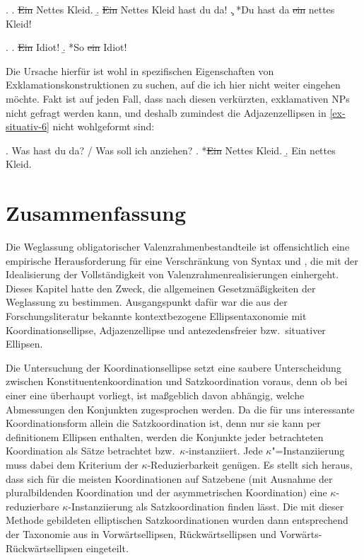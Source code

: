 \ex. \label{ex-situativ-4}
\a. \sout{Ein} Nettes Kleid.
\b. \sout{Ein} Nettes Kleid hast du da!
\c. *Du hast da \sout{ein} nettes Kleid!

\ex. \label{ex-situativ-5}
\a. \sout{Ein} Idiot!
\b. *So \sout{ein} Idiot!

Die Ursache hierfür ist wohl in spezifischen Eigenschaften von Exklamationskonstruktionen zu suchen, auf die ich hier nicht weiter eingehen möchte. Fakt ist auf jeden Fall, dass nach diesen verkürzten, exklamativen NPs nicht gefragt werden kann, und deshalb zumindest die Adjazenzellipsen in \ref{ex-situativ-6} nicht wohlgeformt sind:    

\ex. \label{ex-situativ-6}Was hast du da? / Was soll ich anziehen?
\a. *\sout{Ein} Nettes Kleid.
\b. Ein nettes Kleid.



\section{Zusammenfassung}

Die Weglassung obligatorischer Valenzrahmenbestandteile ist offensichtlich eine empirische Herausforderung für eine Verschränkung von Syntax und , die mit der Idealisierung der  Vollständigkeit von Valenzrahmenrealisierungen einhergeht. Dieses Kapitel hatte den Zweck, die allgemeinen Gesetzmäßigkeiten der Weglassung zu bestimmen. Ausgangspunkt dafür war die aus der Forschungsliteratur bekannte kontextbezogene Ellipsentaxonomie mit Koordinationsellipse, Adjazenzellipse und antezedensfreier bzw.\ situativer Ellipsen. 

Die Untersuchung der Koordinationsellipse setzt eine saubere Unterscheidung zwischen Konstituentenkoordination und Satzkoordination voraus, denn ob bei einer  eine  überhaupt vorliegt, ist ma\ss geblich davon abhängig, welche Abmessungen den Konjunkten zugesprochen werden. Da die für uns interessante Koordinationsform allein die Satzkoordination ist, denn nur sie kann per definitionem Ellipsen enthalten, werden die Konjunkte jeder betrachteten Koordination als Sätze betrachtet bzw.\ $\kappa$-instanziiert. Jede $\kappa$"=Instanziierung muss dabei dem Kriterium der $\kappa$-Reduzierbarkeit genügen. Es stellt sich heraus, dass sich für die meisten Koordinationen auf Satzebene (mit Ausnahme der pluralbildenden Koordination und der asymmetrischen Koordination) eine $\kappa$-reduzierbare $\kappa$-Instanziierung als Satzkoordination finden lässt. Die mit dieser Methode gebildeten elliptischen Satzkoordinationen wurden dann entsprechend der Taxonomie aus \cite{Klein:93} in Vorwärtsellipsen, Rückwärtsellipsen und Vorwärts-Rückwärtsellipsen eingeteilt.  

